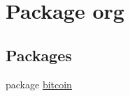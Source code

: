 \hypertarget{namespaceorg}{}\section{Package org}
\label{namespaceorg}
\subsection*{Packages}
\begin{DoxyCompactItemize}
\item 
package \hyperlink{namespaceorg_1_1bitcoin}{bitcoin}
\end{DoxyCompactItemize}
